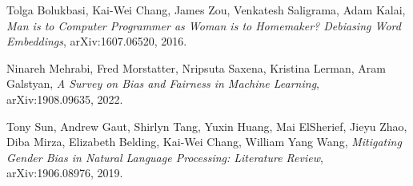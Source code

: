 Tolga Bolukbasi, Kai-Wei Chang, James Zou, Venkatesh Saligrama, Adam Kalai,
\textit{Man is to Computer Programmer as Woman is to Homemaker? Debiasing Word Embeddings},
arXiv:1607.06520, 2016.

Ninareh Mehrabi, Fred Morstatter, Nripsuta Saxena, Kristina Lerman, Aram Galstyan,
\textit{A Survey on Bias and Fairness in Machine Learning},
arXiv:1908.09635, 2022.

Tony Sun, Andrew Gaut, Shirlyn Tang, Yuxin Huang, Mai ElSherief, Jieyu Zhao, Diba Mirza, Elizabeth Belding, Kai-Wei Chang, William Yang Wang,
\textit{Mitigating Gender Bias in Natural Language Processing: Literature Review},
arXiv:1906.08976, 2019.

\endinput